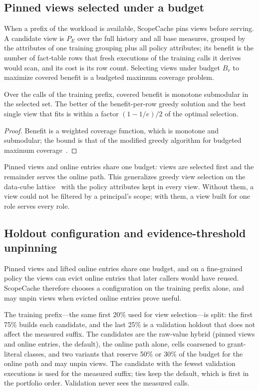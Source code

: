 \documentclass[sigconf, nonacm]{acmart}
\begin{document}
\subsection{Pinned views selected under a budget}

When a prefix of the workload is available, ScopeCache pins views before serving. A candidate view is $P_E$ over the full history and all base measures, grouped by the attributes of one training grouping plus all policy attributes; its benefit is the number of fact-table rows that fresh executions of the training calls it derives would scan, and its cost is its row count. Selecting views under budget $B_v$ to maximize covered benefit is a budgeted maximum coverage problem.

\begin{proposition}[Selection]
\label{prop:select}
Over the calls of the training prefix, covered benefit is monotone submodular in the selected set. The better of the benefit-per-row greedy solution and the best single view that fits is within a factor $(1-1/e)/2$ of the optimal selection.
\end{proposition}
\begin{proof}
Benefit is a weighted coverage function, which is monotone and submodular; the bound is that of the modified greedy algorithm for budgeted maximum coverage~\cite{kmn99,celf07}.
\end{proof}

Pinned views and online entries share one budget: views are selected first and the remainder serves the online path. This generalizes greedy view selection on the data-cube lattice~\cite{hru96} with the policy attributes kept in every view. Without them, a view could not be filtered by a principal's scope; with them, a view built for one role serves every role.

\subsection{Holdout configuration and evidence-threshold unpinning}
\label{sec:adapt}

Pinned views and lifted online entries share one budget, and on a fine-grained policy the views can evict online entries that later callers would have reused. ScopeCache therefore chooses a configuration on the training prefix alone, and may unpin views when evicted online entries prove useful.

The training prefix---the same first 20\% used for view selection---is split: the first 75\% builds each candidate, and the last 25\% is a validation holdout that does not affect the measured suffix. The candidates are the raw-value hybrid (pinned views and online entries, the default), the online path alone, cells coarsened to grant-literal classes, and two variants that reserve 50\% or 30\% of the budget for the online path and may unpin views. The candidate with the fewest validation executions is used for the measured suffix; ties keep the default, which is first in the portfolio order. Validation never sees the measured calls.
\end{document}
